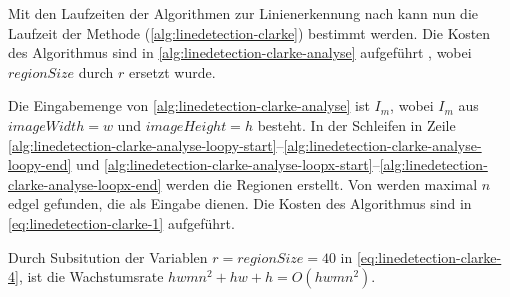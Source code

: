 Mit den Laufzeiten der Algorithmen zur Linienerkennung nach \citeauthor{clarke96} kann nun die Laufzeit der Methode
  (\autoref{alg:linedetection-clarke}) bestimmt werden. Die Kosten des Algorithmus sind in \autoref{alg:linedetection-clarke-analyse} aufgeführt , wobei $\mathit{regionSize}$ durch $r$ ersetzt wurde.

Die Eingabemenge von \autoref{alg:linedetection-clarke-analyse} ist $I_m$, wobei $I_m$ aus $\mathit{imageWidth} = w$
 und $\mathit{imageHeight} = h$ besteht. In der Schleifen in Zeile
 \ref{alg:linedetection-clarke-analyse-loopy-start}--\ref{alg:linedetection-clarke-analyse-loopy-end} und
 \ref{alg:linedetection-clarke-analyse-loopx-start}--\ref{alg:linedetection-clarke-analyse-loopx-end} werden die
 Regionen erstellt. Von  werden maximal $n$ \gls{edgel} gefunden, die 
 als Eingabe dienen. Die Kosten des Algorithmus sind in \autoref{eq:linedetection-clarke-1} aufgeführt.

Durch Subsitution der Variablen $r = \mathit{regionSize} = 40$ in \autoref{eq:linedetection-clarke-4}, ist die
 Wachstumsrate $hwmn^2 + hw + h = O(hwmn^2)$.
